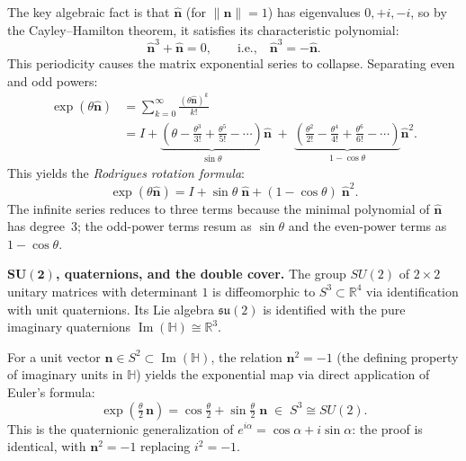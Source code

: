 \documentclass[12pt]{amsart}
\theoremstyle{definition}
\theoremstyle{remark}
\newcommand{\R}{\mathbb{R}}
\begin{document}
The key algebraic fact is that $\hat{\mathbf{n}}$ (for $\|\mathbf{n}\| = 1$) has eigenvalues $0, +i, -i$, so by the Cayley--Hamilton theorem, it satisfies its characteristic polynomial:
\begin{equation}\label{eq:cayley-hamilton-so3}
\hat{\mathbf{n}}^3 + \hat{\mathbf{n}} = 0, \qquad\text{i.e.,}\quad \hat{\mathbf{n}}^3 = -\hat{\mathbf{n}}.
\end{equation}
This periodicity causes the matrix exponential series to collapse. Separating even and odd powers:
\begin{align*}
\exp(\theta\hat{\mathbf{n}})
&= \sum_{k=0}^{\infty} \frac{(\theta\hat{\mathbf{n}})^k}{k!} \\
&= I + \underbrace{\left(\theta - \frac{\theta^3}{3!} + \frac{\theta^5}{5!} - \cdots\right)}_{\displaystyle\sin\theta}\hat{\mathbf{n}} \;+\; \underbrace{\left(\frac{\theta^2}{2!} - \frac{\theta^4}{4!} + \frac{\theta^6}{6!} - \cdots\right)}_{\displaystyle 1 - \cos\theta}\hat{\mathbf{n}}^2.
\end{align*}
This yields the \emph{Rodrigues rotation formula}:
\begin{equation}\label{eq:rodrigues}
\exp(\theta\hat{\mathbf{n}}) = I + \sin\theta\;\hat{\mathbf{n}} + (1 - \cos\theta)\;\hat{\mathbf{n}}^2.
\end{equation}
The infinite series reduces to three terms because the minimal polynomial of $\hat{\mathbf{n}}$ has degree~3; the odd-power terms resum as $\sin\theta$ and the even-power terms as $1 - \cos\theta$.

\medskip\noindent\textbf{$\boldsymbol{SU(2)}$, quaternions, and the double cover.}
The group $SU(2)$ of $2 \times 2$ unitary matrices with determinant $1$ is diffeomorphic to $S^3 \subset \R^4$ via identification with unit quaternions. Its Lie algebra $\mathfrak{su}(2)$ is identified with the pure imaginary quaternions $\operatorname{Im}(\mathbb{H}) \cong \R^3$.

For a unit vector $\mathbf{n} \in S^2 \subset \operatorname{Im}(\mathbb{H})$, the relation $\mathbf{n}^2 = -1$ (the defining property of imaginary units in $\mathbb{H}$) yields the exponential map via direct application of Euler's formula:
\begin{equation}\label{eq:quat-exp}
\exp\!\left(\tfrac{\theta}{2}\,\mathbf{n}\right) = \cos\tfrac{\theta}{2} + \sin\tfrac{\theta}{2}\;\mathbf{n} \;\in\; S^3 \cong SU(2).
\end{equation}
This is the quaternionic generalization of $e^{i\alpha} = \cos\alpha + i\sin\alpha$: the proof is identical, with $\mathbf{n}^2 = -1$ replacing $i^2 = -1$.
\end{document}

